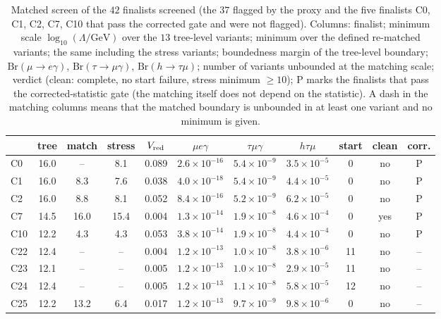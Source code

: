 \documentclass[twocolumn,epjc3]{svjour3}
\newcommand{\Br}{\mathrm{Br}}
\begin{document}
\begin{table}[t]\centering\scriptsize\setlength{\tabcolsep}{3pt}
\caption{Matched screen of the $42$ finalists screened (the $37$ flagged by the proxy and the five finalists C0, C1, C2, C7, C10 that pass the corrected gate and were not flagged). Columns: finalist; minimum scale $\log_{10}(\Lambda/\mathrm{GeV})$ over the $13$ tree-level variants; minimum over the defined re-matched variants; the same including the stress variants; boundedness margin of the tree-level boundary; $\Br(\mu\to e\gamma)$, $\Br(\tau\to\mu\gamma)$, $\Br(h\to\tau\mu)$; number of variants unbounded at the matching scale; verdict (clean: complete, no start failure, stress minimum $\ge10$); P marks the finalists that pass the corrected-statistic gate (the matching itself does not depend on the statistic). A dash in the matching columns means that the matched boundary is unbounded in at least one variant and no minimum is given.}\label{tab:screen}
\begin{tabular}{lcccccccccc}\toprule
 & tree & match & stress & $V_{\rm red}$ & $\mu e\gamma$ & $\tau\mu\gamma$ & $h\tau\mu$ & start & clean & corr.\\\midrule
C0 & 16.0 & -- & 8.1 & 0.089 & $2.6\!\times\!10^{-16}$ & $5.4\!\times\!10^{-9}$ & $3.5\!\times\!10^{-5}$ & 0 & no & P\\
C1 & 16.0 & 8.3 & 7.6 & 0.038 & $4.0\!\times\!10^{-18}$ & $5.4\!\times\!10^{-9}$ & $4.4\!\times\!10^{-5}$ & 0 & no & P\\
C2 & 16.0 & 8.8 & 8.1 & 0.052 & $8.4\!\times\!10^{-16}$ & $5.2\!\times\!10^{-9}$ & $6.2\!\times\!10^{-5}$ & 0 & no & P\\
C7 & 14.5 & 16.0 & 15.4 & 0.004 & $1.3\!\times\!10^{-14}$ & $1.9\!\times\!10^{-8}$ & $4.6\!\times\!10^{-4}$ & 0 & yes & P\\
C10 & 12.2 & 4.3 & 4.3 & 0.053 & $3.8\!\times\!10^{-14}$ & $1.9\!\times\!10^{-8}$ & $4.4\!\times\!10^{-4}$ & 0 & no & P\\
C22 & 12.4 & -- & -- & 0.004 & $1.2\!\times\!10^{-13}$ & $1.0\!\times\!10^{-8}$ & $3.8\!\times\!10^{-6}$ & 11 & no & --\\
C23 & 12.1 & -- & -- & 0.005 & $1.2\!\times\!10^{-13}$ & $1.0\!\times\!10^{-8}$ & $2.9\!\times\!10^{-5}$ & 11 & no & --\\
C24 & 12.4 & -- & -- & 0.005 & $1.2\!\times\!10^{-13}$ & $1.1\!\times\!10^{-8}$ & $5.8\!\times\!10^{-5}$ & 12 & no & --\\
C25 & 12.2 & 13.2 & 6.4 & 0.017 & $1.2\!\times\!10^{-13}$ & $9.7\!\times\!10^{-9}$ & $9.8\!\times\!10^{-6}$ & 0 & no & --\\

\end{tabular}
\end{table}
\end{document}
